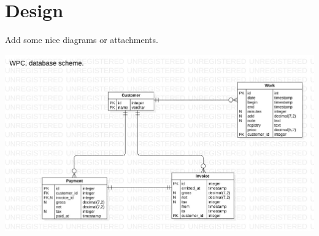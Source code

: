

\graphicspath{ {./images/} }

\section{Design}
Add some nice diagrams or attachments.

\includegraphics[scale=0.4]{wpc_data_model}



